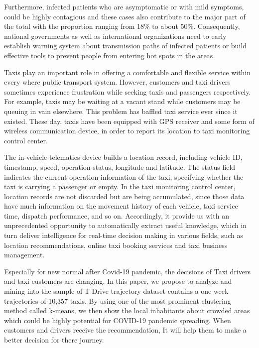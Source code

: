 \documentclass[journal]{IEEEtran}
\begin{document}
Furthermore, infected patients who are asymptomatic or with mild symptoms, could be highly contagious and these cases also contribute to the major part of the total with the proportion ranging from 18$\%$ to about 50$\%$\cite{qiu2020covert}. Consequently, national governments as well as international organizations need to early establish warning system about transmission paths of infected patients or build effective tools to prevent people from entering hot spots in the areas. 

Taxis play an important role in offering a comfortable and flexible service within every where public transport system. However, customers and taxi drivers sometimes experience frustration while seeking taxis and passengers respectively. For example, taxis may be waiting at a vacant stand while customers may be queuing in vain elsewhere. This problem has baffled taxi service ever since it existed\cite{meng2010novel}. These day, taxis have been equipped with GPS receiver and some form of wireless communication device, in order to report its location to taxi monitoring control center\cite{santani2008spatio}. 

The in-vehicle telematics device builds a location record, including vehicle ID, timestamp, speed, operation status, longitude and latitude. The status field indicates the current operation information of the taxi, specifying whether the taxi is carrying a passenger or empty. In the taxi monitoring control center, location records are not discarded but are being accumulated, since those data have much information on the movement history of each vehicle, taxi service time, dispatch performance, and so on\cite{lee2008analysis}. Accordingly, it provide us with an unprecedented opportunity to automatically extract useful knowledge, which in turn deliver intelligence for real-time decision making in various fields, such as location recommendations, online taxi booking services and taxi business management.

Especially for new normal after Covid-19 pandemic, the decisions of Taxi drivers and taxi customers are changing. In this paper, we propose to analyze and mining into the sample of T-Drive trajectory dataset contains a one-week trajectories of 10,357 taxis. By using one of the most prominent clustering method called k-means, we then show the local inhabitants about crowded areas which could be highly potential for COVID-19 pandemic spreading. When customers and drivers receive the recommendation, It will help them to make a better decision for there journey.
\end{document}
